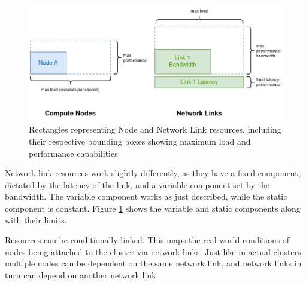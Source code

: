 \documentclass[draft,final]{vutinfth} %
\begin{document}
\begin{figure}
    \centering
    \includegraphics[width=14cm]{graphics/diagrams/lb_squares_real.png}
    \caption{Rectangles representing Node and Network Link resources, including their respective bounding boxes showing maximum load and performance capabilities}
    \label{fig:lb_squares_real}
\end{figure}
Network link resources work slightly differently, as they have a fixed component, dictated by the latency of the link, and a variable component set by the bandwidth. The variable component works as just described, while the static component is constant. Figure \ref{fig:lb_squares_real} shows the variable and static components along with their limits.

Resources can be conditionally linked. This maps the real world conditions of nodes being attached to the cluster via network links. Just like in actual clusters multiple nodes can be dependent on the same network link, and network links in turn can depend on another network link. 
\end{document}
